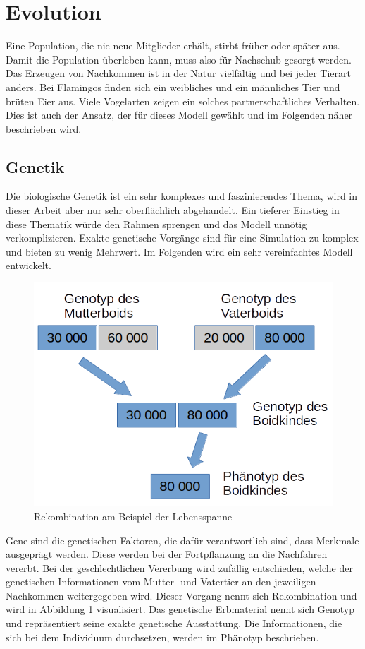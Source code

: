 \documentclass[draft=false
              ,paper=a4
              ,twoside=false
              ,fontsize=11pt
              ,headsepline
              ,BCOR10mm
              ,DIV11
              ,bibtotoc
              ,liststotoc
              ]{scrbook}
\begin{document}
\section{Evolution}
Eine Population, die nie neue Mitglieder erhält, stirbt früher oder später aus. Damit die Population überleben kann, muss also für Nachschub gesorgt werden. Das Erzeugen von Nachkommen ist in der Natur vielfältig und bei jeder Tierart anders. Bei Flamingos finden sich ein weibliches und ein männliches Tier und brüten Eier aus. Viele Vogelarten zeigen ein solches partnerschaftliches Verhalten. Dies ist auch der Ansatz, der für dieses Modell gewählt und im Folgenden näher beschrieben wird.

\subsection{Genetik}
Die biologische Genetik ist ein sehr komplexes und faszinierendes Thema, wird in dieser Arbeit aber nur sehr oberflächlich abgehandelt. Ein tieferer Einstieg in diese Thematik würde den Rahmen sprengen und das Modell unnötig verkomplizieren. Exakte genetische Vorgänge \cite{genetik} sind für eine Simulation zu komplex und bieten zu wenig Mehrwert. Im Folgenden wird ein sehr vereinfachtes Modell entwickelt.

\begin{figure}[!h]
\centering
\includegraphics[scale=0.30]{project/rekombination.png}
\caption{Rekombination am Beispiel der Lebensspanne}
\label{rekombination}
\end{figure}

Gene sind die genetischen Faktoren, die dafür verantwortlich sind, dass Merkmale ausgeprägt werden. Diese werden bei der Fortpflanzung an die Nachfahren vererbt. Bei der geschlechtlichen Vererbung wird zufällig entschieden, welche der genetischen Informationen vom Mutter- und Vatertier an den jeweiligen Nachkommen weitergegeben wird. Dieser Vorgang nennt sich Rekombination und wird in Abbildung \ref{rekombination} visualisiert. Das genetische Erbmaterial nennt sich Genotyp und repräsentiert seine exakte genetische Ausstattung. Die Informationen, die sich bei dem Individuum durchsetzen, werden im Phänotyp beschrieben.
\end{document}
